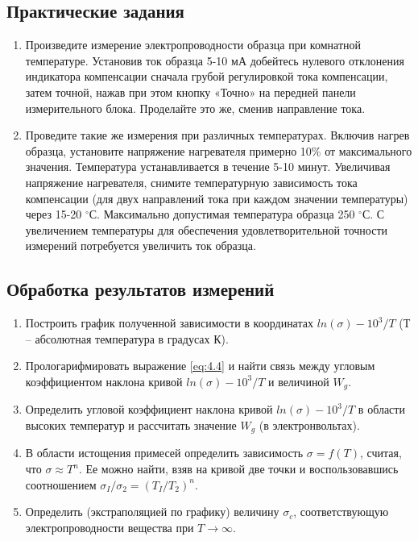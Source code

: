 \subsection*{Практические задания}

\begin{enumerate}
	\item Произведите измерение электропроводности образца при комнатной температуре. Установив ток образца 5-10 мА
	добейтесь нулевого отклонения индикатора компенсации сначала грубой регулировкой тока компенсации, затем точной,
	нажав при этом кнопку «Точно» на передней панели измерительного блока. Проделайте это же, сменив направление тока.
	\item Проведите такие же измерения при различных температурах. Включив нагрев образца, установите напряжение
	нагревателя примерно 10\% от максимального значения. Температура устанавливается в течение 5-10 минут. Увеличивая
	напряжение нагревателя, снимите температурную зависимость тока компенсации (для двух направлений тока при каждом
	значении температуры) через 15-20 $^{\circ}$С. Максимально допустимая температура образца 250 $^{\circ}$С.
	С увеличением температуры для обеспечения удовлетворительной точности измерений потребуется увеличить ток образца.
\end{enumerate} 

\subsection*{Обработка результатов измерений}
\begin{enumerate}
	\item Построить график полученной зависимости в координатах $ln(\sigma)-10^3/T$ (Т – абсолютная температура в градусах К).
	\item Прологарифмировать выражение \eqref{eq:4.4} и найти связь между угловым коэффициентом наклона кривой
	$ln(\sigma)-10^3/T$ и величиной $W_g$.
	\item Определить угловой коэффициент наклона кривой $ln(\sigma)-10^3/T$ в области высоких температур и рассчитать
	значение $W_g$ (в электронвольтах).
	\item В области истощения примесей определить зависимость $\sigma = f(T)$, считая, что $\sigma \approx T^n$. Ее
	можно найти, взяв на кривой две точки и воспользовавшись соотношением $\sigma_{I} / \sigma_{2}=\left(T_{I} /
	T_{2}\right)^{n}$.
	\item Определить (экстраполяцией по графику) величину $\sigma_c$, соответствующую
	электропроводности вещества при $T \to \infty$.
\end{enumerate}


